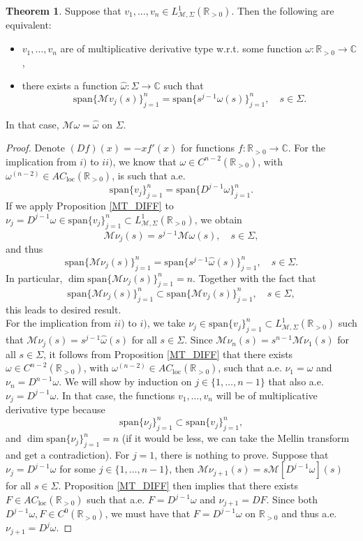 \documentclass[a4paper,12pt,oneside]{article}
\theoremstyle{definition}
\newtheorem{thm}[defi]{Theorem}
\newcommand{\C}{\mathbb{C}}
\newcommand{\R}{\mathbb{R}}
\newcommand{\om}{\omega}
\newcommand{\spn}[1]{\text{span}\{#1\}}
\newcommand{\MT}[1]{\mathcal{M}#1}
\begin{document}
\begin{thm} \label{MDT_ALG}
    Suppose that $v_1,\dots,v_n\in L_{\MT{},\Sigma}^1(\R_{>0})$. Then the following are equivalent:
    \begin{itemize}
        \item[$i)$] $v_1,\dots,v_n$ are of multiplicative derivative type w.r.t. some function $\om:\R_{>0}\to\C$,
        \item[$ii)$] there exists a function $\hat{\om}:\Sigma\to\C$ such that
        $$\spn{\MT{v}_j(s)}_{j=1}^n = \spn{ s^{j-1} \hat{\om}(s)}_{j=1}^n,\quad s\in \Sigma.$$
    \end{itemize}
    In that case, $\MT{\om}=\hat{\om}$ on $\Sigma$.
\end{thm}
\begin{proof}
    Denote $(Df)(x)=-xf'(x)$ for functions $f:\R_{>0}\to\C$. For the implication from $i)$ to $ii)$, we know that $\om\in C^{n-2}(\R_{>0})$, with $\om^{(n-2)} \in AC_{\text{loc}}(\R_{>0})$, is such that a.e.
        $$\spn{v_j}_{j=1}^n = \spn{D^{j-1}\om}_{j=1}^n.$$
    If we apply Proposition \ref{MT_DIFF} to $\nu_j = D^{j-1}\om\in\spn{v_j}_{j=1}^n\subset L_{\MT{},\Sigma}^1(\R_{>0})$, we obtain
        $$ \MT{\nu}_j(s) = s^{j-1} \MT{\om}(s) ,\quad s\in\Sigma, $$        
    and thus
        $$\spn{\MT{\nu}_j(s)}_{j=1}^n = \spn{ s^{j-1} \hat{\om}(s)}_{j=1}^n,\quad s\in \Sigma.$$
    In particular, $\dim\spn{\MT{\nu}_j(s)}_{j=1}^n = n$. Together with the fact that
        $$\spn{\MT{\nu}_j(s)}_{j=1}^n \subset \spn{\MT{v}_j(s)}_{j=1}^n,\quad s\in \Sigma,$$
    this leads to desired result. \\
    For the implication from $ii)$ to $i)$, we take $\nu_j\in\spn{v_j}_{j=1}^n\subset L_{\MT{},\Sigma}^1(\R_{>0})$ such that $\MT{\nu}_j(s) = s^{j-1} \hat{\om}(s)$ for all $s\in\Sigma$. Since $\MT{\nu}_n(s) = s^{n-1} \MT{\nu}_1(s)$ for all $s\in\Sigma$, it follows from Proposition \ref{MT_DIFF} that there exists $\om\in C^{n-2}(\R_{>0})$, with $\om^{(n-2)} \in AC_{\text{loc}}(\R_{>0})$, such that a.e. $\nu_1=\om$ and $\nu_n=D^{n-1}\om$. We will show by induction on $j\in\{1,\dots,n-1\}$ that also a.e. $\nu_j = D^{j-1}\om$. In that case, the functions $v_1,\dots,v_n$ will be of multiplicative derivative type because
    $$ \spn{\nu_j}_{j=1}^n \subset \spn{v_j}_{j=1}^n,$$
    and $\dim \spn{\nu_j}_{j=1}^n = n$ (if it would be less, we can take the Mellin transform and get a contradiction). For $j=1$, there is nothing to prove. Suppose that $\nu_j = D^{j-1}\om$ for some $j\in\{1,\dots,n-1\}$, then $ \MT{\nu_{j+1}}(s) = s \MT{[D^{j-1}\om]}(s)$ for all $s\in\Sigma$. Proposition \ref{MT_DIFF} then implies that there exists $F\in AC_{\text{loc}}(\R_{>0})$ such that a.e. $F=D^{j-1}\om$ and $\nu_{j+1}=DF$. Since both $D^{j-1}\om,F\in C^{0}(\R_{>0})$, we must have that $F=D^{j-1}\om$ on $\R_{>0}$ and thus a.e. $\nu_{j+1}=D^{j}\om$. 
\end{proof}
\end{document}
